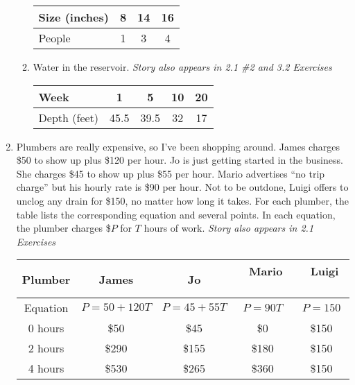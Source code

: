 \begin{enumerate}
\begin{enumerate}
\bigskip
\begin{tabular} {|l|| c  |c |c|}\hline
Size (inches) & 8  & 14 & 16 \\ \hline
People & 1 & 3 & 4 \\ \hline
\end{tabular} 
\vfill

\item Water in the reservoir. \hfill \emph{Story also appears in 2.1 \#2 and 3.2 Exercises}

\bigskip
\begin{tabular} {|l|| c  |c  |c |c|}\hline
Week & 1 & 5 & 10 & 20 \\ \hline
Depth (feet) & 45.5 & 39.5 & 32 & 17 \\ \hline
\end{tabular}
\vfill


\end{enumerate}

\newpage %

\item Plumbers are really expensive, so I've been shopping around.  James charges \$50 to show up plus \$120 per hour. Jo is just getting started in the business.  She charges \$45 to show up plus \$55 per hour.  Mario advertises ``no trip charge'' but his hourly rate is \$90 per hour. Not to be outdone, Luigi offers to unclog any drain for \$150, no matter how long it takes.  For each plumber, the table lists the corresponding equation and several points.   In each equation,  the plumber charges \$$P$ for $T$ hours of work.   \hfill \emph{Story also appears in 2.1 Exercises}
\begin{center}
\begin{tabular} {|c|| c|| c|| c|| c| } \hline
Plumber & James & Jo &~\quad Mario \quad ~& ~\quad Luigi \quad ~\\  \hline
Equation & $P=50+120T$ & $P=45+55T$ & $P=90T$ & $P=150$ \\ \hline \hline
0 hours & \$50 & \$45 & \$0 & \$150 \\ \hline
2 hours &  \$290 & \$155 & \$180 & \$150 \\ \hline
4 hours & \$530 & \$265 & \$360 & \$150  \\ \hline
\end{tabular}
\end{center}  


\end{enumerate}
